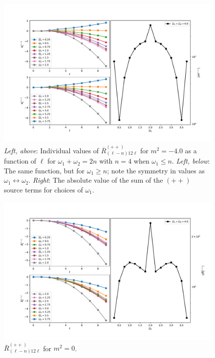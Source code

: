 \documentclass[letterpaper,11pt]{article}
\newcommand{\oone}{\omega_1}
\newcommand{\otwo}{\omega_2}
\begin{document}
\begin{figure}
\centering
	\includegraphics[width=\textwidth]{./figures/NN_equalfreq_ppchannel_n2_m-4_0}
	\caption{{\it Left, above}: Individual values of $\overline{R}^{(++)}_{(\ell - n)12\ell}$ for $m^2 = -4.0$ as a function of $\ell$ for $\oone + \otwo = 2n$ with $n = 4$ when $\oone \leq n$. {\it Left, below}: The same function, but for $\oone \geq n$; note the symmetry in values as $\oone \leftrightarrow \otwo$. {\it Right}: The absolute value of the sum of the $(++)$ source terms for choices of $\oone$.}
	\label{fig:atoi_pp_m-4_0}
\end{figure}

\begin{figure}
\centering
	\includegraphics[width=\textwidth]{./figures/NN_equalfreq_ppchannel_n2_m0_0}
	\caption{$\overline{R}^{(++)}_{(\ell - n)12\ell}$ for $m^2 = 0$.}
\end{figure}
\end{document}
